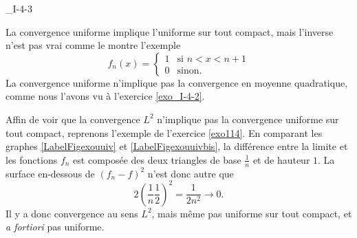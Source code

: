 

\begin{corrige}{_I-4-3}

La convergence uniforme implique l'uniforme sur tout compact, mais l'inverse n'est pas vrai comme le montre l'exemple
\begin{equation}
	f_n(x)=\begin{cases}
	1	&	\text{si $n<x<n+1$}\\
	0	&	 \text{sinon.}
\end{cases}
\end{equation}
La convergence uniforme n'implique pas la convergence en moyenne quadratique, comme nous l'avons vu à l'exercice \ref{exo_I-4-2}.

Affin de voir que la convergence $L^2$ n'implique pas la convergence uniforme sur tout compact, reprenons l'exemple de l'exercice \ref{exo114}. En comparant les graphes \ref{LabelFigexouuiv} et \ref{LabelFigexouuivbis}, la différence entre la limite et les fonctions $f_n$ est composée des deux triangles de base $\frac{1}{ n }$ et de hauteur $1$. La surface en-dessous de $(f_n-f)^2$ n'est donc autre que
\begin{equation}
	2\left( \frac{1}{ n }\frac{1}{ 2 } \right)^2=\frac{1}{ 2n^2 }\to 0.
\end{equation}
Il y a donc convergence au sens $L^2$, mais même pas uniforme sur tout compact, et \emph{a fortiori} pas uniforme.

\end{corrige}
